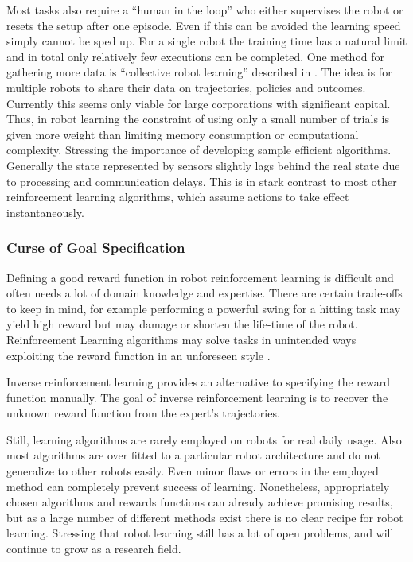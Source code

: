 Most tasks also require a ``human in the loop'' who either supervises the robot
or resets the setup after one episode. Even if this can be avoided the learning
speed simply cannot be sped up.
For a single robot the training time has a natural limit
and in total only relatively few executions can be completed.
One method for gathering more data is ``collective robot learning'' described in
\citet{kehoe2015survey}. The idea is for multiple robots to
share their data on trajectories, policies and outcomes. Currently this seems only
viable for large corporations with significant capital.
Thus, in robot learning the constraint of using only a small number of trials
is given more weight than limiting memory consumption or computational complexity.
Stressing the importance of developing sample efficient algorithms.
Generally the state represented by sensors slightly lags behind the real
state due to processing and communication delays. This is in stark contrast to
most other reinforcement learning algorithms, which assume actions to take effect
instantaneously.

\subsubsection{Curse of Goal Specification}
Defining a good reward function in robot reinforcement learning is
difficult and often needs a lot of domain knowledge and expertise.
There are certain trade-offs to keep in mind, for example performing
a powerful swing for a hitting task may yield high reward but may damage
or shorten the life-time of the robot.
Reinforcement Learning algorithms may solve tasks
in unintended ways exploiting the reward function in an unforeseen style
\citep{ng1999policy}.

Inverse reinforcement learning \citep{russell1998learning}
provides an alternative  to specifying the reward function manually.
The goal of inverse reinforcement learning is to recover the unknown
reward function from the expert's trajectories.

Still, learning algorithms are rarely employed on robots
for real daily usage. Also most
algorithms are over fitted to a particular robot architecture
and do not generalize to other robots easily.
Even minor flaws or errors in the employed method can completely prevent
success of learning.
Nonetheless, appropriately chosen algorithms and rewards functions
can already achieve promising results, but as 
a large number of different methods exist 
there is no clear recipe for robot learning.
Stressing that robot learning still has a lot of open problems,
and will continue to grow as a research field.

